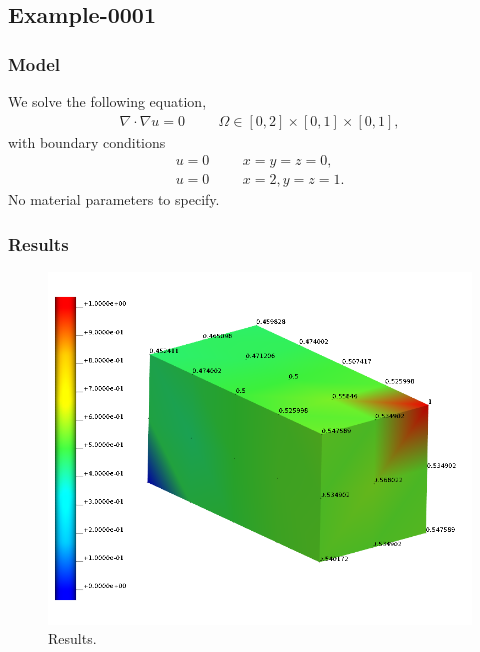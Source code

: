 %
\subsection{Example-0001}
%
%
\subsubsection{Model}
%
We solve the following equation,
%
\begin{align}
    \nabla \cdot \nabla u = 0 & &&\Omega \in [0, 2] \times [0, 1] \times [0, 1],
\end{align}
%
with boundary conditions
%
\begin{align}
    u = 0 & &&x = y = z = 0, \\
    u = 0 & &&x = 2, y = z = 1.
\end{align}
%
No material parameters to specify.
%
%
\subsubsection{Results}
%
\begin{figure}[h!]
    \centering 
    \includegraphics[width=\columnwidth]{examples/example-0001/figures/example.png} 
    \caption{Results.}
    \label{example-0001-fig}
\end{figure}
%
